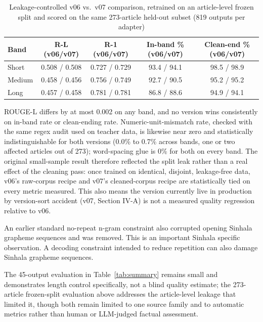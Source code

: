 \documentclass[a4paper,conference]{IEEEtran}
\begin{document}
\begin{table}[!t]
\caption{Leakage-controlled v06 vs.\ v07 comparison, retrained on an
article-level frozen split and scored on the same 273-article held-out
subset (819 outputs per adapter)}
\label{tab:summaryfrozen}
\centering
\footnotesize
\setlength{\tabcolsep}{2.6pt}
\renewcommand{\arraystretch}{1.04}
\begin{tabular}{|l|c|c|c|c|}
\hline
\textbf{Band} & \textbf{R-L (v06/v07)} & \textbf{R-1 (v06/v07)} & \textbf{In-band \% (v06/v07)} & \textbf{Clean-end \% (v06/v07)} \\
\hline
Short  & 0.508 / 0.508 & 0.727 / 0.729 & 93.4 / 94.1 & 98.5 / 98.9 \\
\hline
Medium & 0.458 / 0.456 & 0.756 / 0.749 & 92.7 / 90.5 & 95.2 / 95.2 \\
\hline
Long   & 0.457 / 0.458 & 0.781 / 0.781 & 86.8 / 88.6 & 94.9 / 94.1 \\
\hline
\end{tabular}
\end{table}

ROUGE-L differs by at most 0.002 on any band, and no version wins
consistently on in-band rate or clean-ending rate. Numeric-unit-mismatch
rate, checked with the same regex audit used on teacher data, is likewise
near zero and statistically indistinguishable for both versions (0.0\% to
0.7\% across bands, one or two affected articles out of 273); word-spacing
glue is 0\% for both on every band. The original small-sample result
therefore reflected the split leak rather than a real effect of the
cleaning pass: once trained on identical, disjoint, leakage-free data,
v06's raw-corpus recipe and v07's cleaned-corpus recipe are statistically
tied on every metric measured. This also means the version currently live
in production by version-sort accident (v07, Section IV-A) is not a
measured quality regression relative to v06.

An earlier standard no-repeat n-gram
constraint also corrupted opening Sinhala grapheme sequences and was removed.
This is an important Sinhala specific observation. A decoding constraint intended to
reduce repetition can also damage Sinhala grapheme sequences.

The 45-output evaluation in Table~\ref{tab:summary} remains small and
demonstrates length control specifically, not a blind quality estimate; the
273-article frozen-split evaluation above addresses the article-level
leakage that limited it, though both remain limited to one source family
and to automatic metrics rather than human or LLM-judged factual
assessment.
\end{document}
